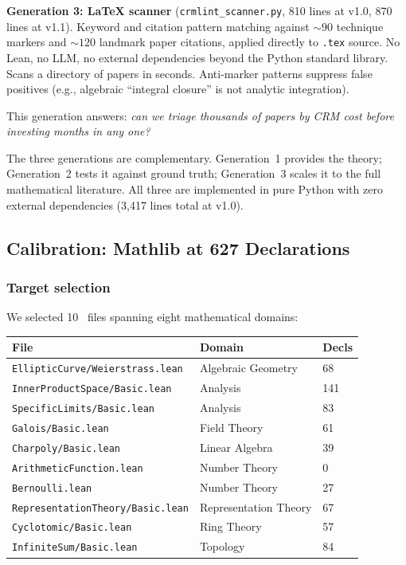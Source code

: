 \medskip
\noindent\textbf{Generation 3: LaTeX scanner}
(\texttt{crmlint\_scanner.py}, 810 lines at v1.0, 870 lines at v1.1).
Keyword and citation pattern matching against ${\sim}90$ technique
markers and ${\sim}120$ landmark paper citations, applied directly to
\texttt{.tex} source.  No Lean, no LLM, no external dependencies
beyond the Python standard library.  Scans a directory of papers in
seconds.  Anti-marker patterns suppress false positives (e.g.,
algebraic ``integral closure'' is not analytic integration).

This generation answers: \emph{can we triage thousands of papers by
CRM cost before investing months in any one?}

\medskip

The three generations are complementary.  Generation~1 provides the
theory; Generation~2 tests it against ground truth; Generation~3
scales it to the full mathematical literature.  All three are
implemented in pure Python with zero external dependencies (3{,}417
lines total at v1.0).


\subsection{Calibration: Mathlib at 627 Declarations}\label{part:mathlib}

\subsubsection{Target selection}\label{sec:target-selection}

We selected 10 \Mathlib\ files spanning eight mathematical domains:

\begin{center}
\small
\begin{tabular}{lll}
\toprule
\textbf{File} & \textbf{Domain} & \textbf{Decls} \\
\midrule
\texttt{EllipticCurve/Weierstrass.lean} & Algebraic Geometry & 68 \\
\texttt{InnerProductSpace/Basic.lean} & Analysis & 141 \\
\texttt{SpecificLimits/Basic.lean} & Analysis & 83 \\
\texttt{Galois/Basic.lean} & Field Theory & 61 \\
\texttt{Charpoly/Basic.lean} & Linear Algebra & 39 \\
\texttt{ArithmeticFunction.lean} & Number Theory & 0 \\
\texttt{Bernoulli.lean} & Number Theory & 27 \\
\texttt{RepresentationTheory/Basic.lean} & Representation Theory & 67 \\
\texttt{Cyclotomic/Basic.lean} & Ring Theory & 57 \\
\texttt{InfiniteSum/Basic.lean} & Topology & 84 \\
\bottomrule
\end{tabular}
\end{center}

